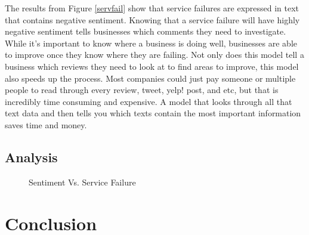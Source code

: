 \documentclass[titlepage,letterpaper]{article}
\begin{document}
The results from Figure \ref{servfail} show that service failures are expressed in text that contains negative sentiment. Knowing that a service failure will have highly negative sentiment tells businesses which comments they need to investigate. While it's important to know where a business is doing well, businesses are able to improve once they know where they are failing. Not only does this model tell a business which reviews they need to look at to find areas to improve, this model also speeds up the process. Most companies could just pay someone or multiple people to read through every review, tweet, yelp! post, and etc, but that is incredibly time consuming and expensive. A model that looks through all that text data and then tells you which texts contain the most important information saves time and money.  


\label{servfail}

\subsection{Analysis}

%	

\begin{figure}[htb]
	\centering
	\caption{Sentiment Vs. Service Failure}
	\label{sentivfail}
	
\end{figure}



\section{Conclusion}


\clearpage


\printbibliography
\end{document}
